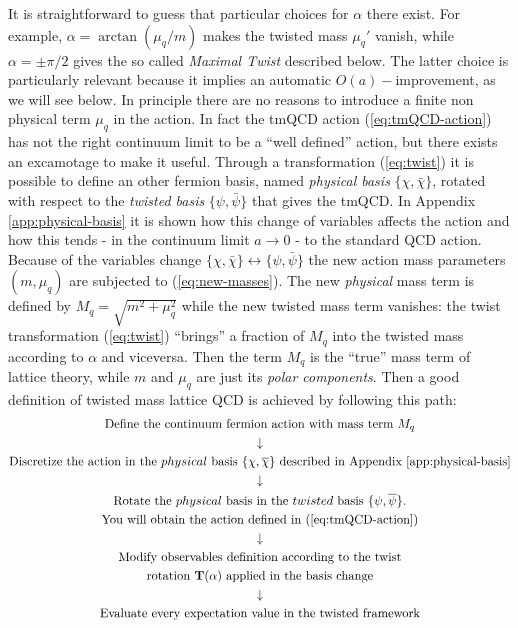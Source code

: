 \documentclass[english, LaM, oneside, noexaminfo]{sapthesis}
\newcommand{\oait}{$O(a)-$improvement}
\begin{document}
It is straightforward to guess that particular choices for $\alpha$ there exist. 
For example, $\alpha = \arctan (\mu_q/m)$ makes the twisted mass $\mu_q'$ vanish, while $\alpha = \pm \pi/2$ gives the so called {\it Maximal Twist} described below. 
The latter choice is particularly relevant because it implies an automatic \oait, as we will see below.
\newline
In principle there are no reasons to introduce a finite non physical term $\mu_q$ in the action.
In fact the tmQCD action (\ref{eq:tmQCD-action}) has not the right continuum limit to be a ``well defined'' action, but there exists an excamotage to make it useful.
Through a transformation (\ref{eq:twist}) it is possible to define an other fermion basis, named \textit{physical basis} $\{\chi, \bar\chi\}$, rotated with respect to the \textit{twisted basis} $\{\psi, \bar\psi\}$ that gives the tmQCD.
In Appendix \ref{app:physical-basis} it is shown how this change of variables affects the action and how this tends - in the continuum limit $a\rightarrow 0$ - to the standard QCD action.
Because of the variables change $\{\chi, \bar\chi\} \leftrightarrow \{\psi, \bar\psi\}$ the new action mass parameters $(m,\mu_q)$ are subjected to (\ref{eq:new-masses}).
The new \textit{physical} mass term is defined by $M_q = \sqrt{m^2 + \mu_q ^2}$ while the new twisted mass term vanishes: the twist transformation (\ref{eq:twist}) ``brings'' a fraction of $M_q$ into the twisted mass according to $\alpha$ and viceversa.
Then the term $M_q$ is the ``true'' mass term of lattice theory, while $m$ and $\mu_q$ are just its \textit{polar components}.
Then a good definition of twisted mass lattice QCD is achieved by following this path:
\begin{equation*}
    \begin{gathered}
        \text{Define the continuum fermion action with mass term } M_q \\
        \downarrow \\
        \text{Discretize the action in the } physical \text{ basis } \{\chi,\overline{\chi}\} \text{ described in Appendix \ref{app:physical-basis}} \\
        \downarrow  \\
        \text{Rotate the } physical \text{ basis in the } twisted \text{ basis } \{\psi,\overline{\psi}\} \text{.} \\
        \text{You will obtain the action defined in (\ref{eq:tmQCD-action})} \\
        \downarrow \\
        \text{Modify observables definition according to the twist}\\
        \text{rotation } \mathbf{T}(\alpha)  \text{ applied in the basis change}\\
        \downarrow \\
        \text{Evaluate every expectation value in the twisted framework}
    \end{gathered}
\end{equation*}
\end{document}
